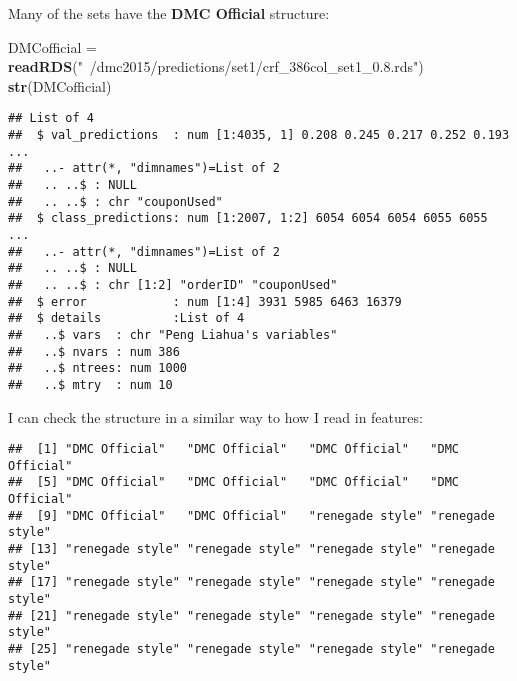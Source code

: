 \documentclass[10pt]{report}
\newenvironment{Shaded}{}{}
\newcommand{\KeywordTok}[1]{\textcolor[rgb]{0.00,0.44,0.13}{\textbf{{#1}}}}
\newcommand{\DecValTok}[1]{\textcolor[rgb]{0.25,0.63,0.44}{{#1}}}
\newcommand{\StringTok}[1]{\textcolor[rgb]{0.25,0.44,0.63}{{#1}}}
\newcommand{\NormalTok}[1]{{#1}}
\begin{document}
Many of the sets have the \textbf{DMC Official} structure:

\begin{Shaded}
\begin{Highlighting}[]
\NormalTok{DMCofficial =}\StringTok{ }\KeywordTok{readRDS}\NormalTok{(}\StringTok{"~/dmc2015/predictions/set1/crf_386col_set1_0.8.rds"}\NormalTok{)}
\KeywordTok{str}\NormalTok{(DMCofficial)}
\end{Highlighting}
\end{Shaded}

\begin{verbatim}
## List of 4
##  $ val_predictions  : num [1:4035, 1] 0.208 0.245 0.217 0.252 0.193 ...
##   ..- attr(*, "dimnames")=List of 2
##   .. ..$ : NULL
##   .. ..$ : chr "couponUsed"
##  $ class_predictions: num [1:2007, 1:2] 6054 6054 6054 6055 6055 ...
##   ..- attr(*, "dimnames")=List of 2
##   .. ..$ : NULL
##   .. ..$ : chr [1:2] "orderID" "couponUsed"
##  $ error            : num [1:4] 3931 5985 6463 16379
##  $ details          :List of 4
##   ..$ vars  : chr "Peng Liahua's variables"
##   ..$ nvars : num 386
##   ..$ ntrees: num 1000
##   ..$ mtry  : num 10
\end{verbatim}

I can check the structure in a similar way to how I read in features:

\begin{Shaded}
\end{Shaded}

\begin{verbatim}
##  [1] "DMC Official"   "DMC Official"   "DMC Official"   "DMC Official"  
##  [5] "DMC Official"   "DMC Official"   "DMC Official"   "DMC Official"  
##  [9] "DMC Official"   "DMC Official"   "renegade style" "renegade style"
## [13] "renegade style" "renegade style" "renegade style" "renegade style"
## [17] "renegade style" "renegade style" "renegade style" "renegade style"
## [21] "renegade style" "renegade style" "renegade style" "renegade style"
## [25] "renegade style" "renegade style" "renegade style" "renegade style"
\end{verbatim}
\end{document}
